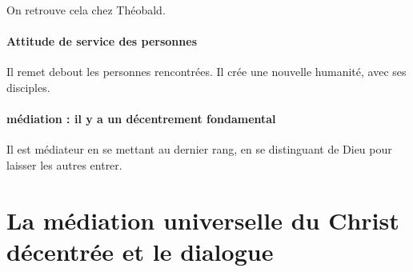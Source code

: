  On retrouve cela chez Théobald.

 \paragraph{Attitude de service des personnes} Il remet debout les personnes rencontrées. Il crée une nouvelle humanité, avec ses disciples. 

 \paragraph{médiation : il y a un décentrement fondamental} Il est médiateur en se mettant au dernier rang, en se distinguant de Dieu pour laisser les autres entrer.
 

\section{La médiation universelle du Christ décentrée et le dialogue}
